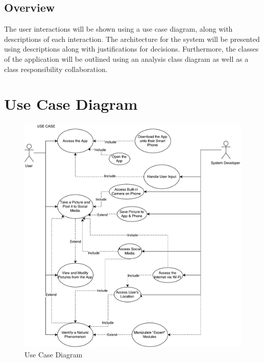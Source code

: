 \documentclass[]{article}
\begin{document}
\subsection{Overview}
\label{sub:overview}
The user interactions will be shown using a use case diagram, along with descriptions of each interaction.  The architecture for the system will be presented using descriptions along with justifications for decisions.  Furthermore, the classes of the application will be outlined using an analysis class diagram as well as a class responsibility collaboration. 


\section{Use Case Diagram}
\begin{figure}
	\includegraphics[width=\linewidth]{usecase.pdf}
	\caption{Use Case Diagram}
\end{figure}
\end{document}

